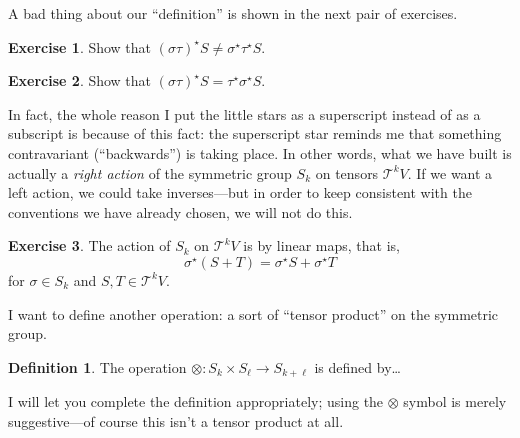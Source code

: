 \documentclass[12pt]{article}
\theoremstyle{definition}
\newtheorem*{definition}{Definition}
\newtheorem*{exercise}{Exercise}
\newcommand{\Tensor}[2]{\mathcal{T}^{#2} #1}
\begin{document}
A bad thing about our ``definition'' is shown in the next pair of
exercises.
\begin{exercise}
Show that $\left(\sigma \tau\right)^\star S \neq \sigma^\star \tau^\star S$.
\end{exercise}
\begin{exercise}
Show that $\left(\sigma \tau\right)^\star S = \tau^\star \sigma^\star S$.
\end{exercise}
In fact, the whole reason I put the little stars as a superscript
instead of as a subscript is because of this fact: the superscript
star reminds me that something contravariant (``backwards'') is taking
place.  In other words, what we have built is actually a \textit{right
  action} of the symmetric group $S_k$ on tensors $\Tensor{V}{k}$.  If
we want a left action, we could take inverses---but in order to keep
consistent with the conventions we have already chosen, we will not do
this.

\begin{exercise}
The action of $S_k$ on $\Tensor{V}{k}$ is by linear maps, that is,
$$
\sigma^\star ( S + T ) = \sigma^\star S + \sigma^\star T
$$
for $\sigma \in S_k$ and $S, T \in \Tensor{V}{k}$.
\end{exercise}

I want to define another operation: a sort of ``tensor product'' on
the symmetric group.
\begin{definition}
The operation $\otimes : S_k \times S_\ell \to S_{k + \ell}$ is defined by\ldots
\end{definition}
\noindent
I will let you complete the definition appropriately; using the
$\otimes$ symbol is merely suggestive---of course this isn't a tensor
product at all.
\end{document}
